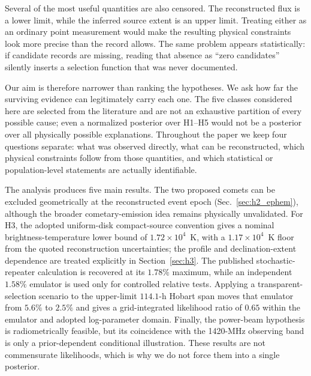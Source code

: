 \documentclass[crop]{CSL}
\begin{document}
Several of the most useful quantities are also censored. The reconstructed flux is a lower limit, while the inferred source extent is an upper limit. Treating either as an ordinary point measurement would make the resulting physical constraints look more precise than the record allows. The same problem appears statistically: if candidate records are missing, reading that absence as ``zero candidates'' silently inserts a selection function that was never documented.

Our aim is therefore narrower than ranking the hypotheses. We ask how far the surviving evidence can legitimately carry each one. The five classes considered here are selected from the literature and are not an exhaustive partition of every possible cause; even a normalized posterior over H1--H5 would not be a posterior over all physically possible explanations. Throughout the paper we keep four questions separate: what was observed directly, what can be reconstructed, which physical constraints follow from those quantities, and which statistical or population-level statements are actually identifiable.

The analysis produces five main results. The two proposed comets can be excluded geometrically at the reconstructed event epoch (Sec.~\ref{sec:h2_ephem}), although the broader cometary-emission idea remains physically unvalidated. For H3, the adopted uniform-disk compact-source convention gives a nominal brightness-temperature lower bound of $1.72\times10^4$~K, with a $1.17\times10^4$~K floor from the quoted reconstruction uncertainties; the profile and declination-extent dependence are treated explicitly in Section~\ref{sec:h3}. The published stochastic-repeater calculation is recovered at its $1.78\%$ maximum, while an independent $1.58\%$ emulator is used only for controlled relative tests. Applying a transparent-selection scenario to the upper-limit $114.1$-h Hobart span moves that emulator from $5.6\%$ to $2.5\%$ and gives a grid-integrated likelihood ratio of $0.65$ within the emulator and adopted log-parameter domain. Finally, the power-beam hypothesis is radiometrically feasible, but its coincidence with the 1420-MHz observing band is only a prior-dependent conditional illustration. These results are not commensurate likelihoods, which is why we do not force them into a single posterior.

\end{document}
